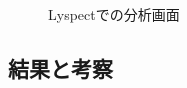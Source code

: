 \begin{figure}[htbp]
  \begin{minipage}{\hsize}
    \begin{center}
    \end{center}
    \caption{Lyspectでの分析画面}
    \label{fig:lyspect}
  \end{minipage}
\end{figure}


\subsection{結果と考察}